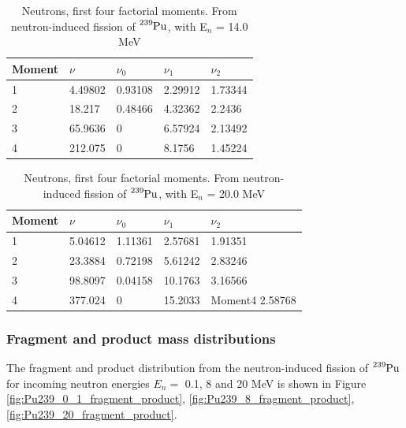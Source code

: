 \documentclass[]{article}
\begin{document}
\begin{table} [H]
	\centering
	\caption{Neutrons, first four factorial moments. From neutron-induced fission of $\ce{^{239}Pu}$, with E$_n$ = 14.0 MeV }
	\begin{tabularx}{\textwidth}{XXXXX} \hline
		\label{tab:Pu239_n_moments_14}
		Moment & $\nu$ & $\nu_0$ & $\nu_1$ & $\nu_2$ \\ \hline
		1 & 4.49802 & 0.93108 & 2.29912 & 1.73344\\
		2 & 18.217 & 0.48466 & 4.32362 & 2.2436\\
		3 & 65.9636 & 0 & 6.57924 & 2.13492\\
		4 & 212.075 & 0 & 8.1756 & 1.45224\\ 
	\end{tabularx}
\end{table}

\begin{table} [H]
	\centering
	\caption{Neutrons, first four factorial moments. From neutron-induced fission of $\ce{^{239}Pu}$, with E$_n$ = 20.0 MeV }
	\begin{tabularx}{\textwidth}{XXXXX} \hline
		\label{tab:Pu239_n_moments_20}
		Moment & $\nu$ & $\nu_0$ & $\nu_1$ & $\nu_2$ \\ \hline
		1 & 5.04612 & 1.11361 & 2.57681 & 1.91351\\
		2 & 23.3884 & 0.72198 & 5.61242 & 2.83246\\
		3 & 98.8097 & 0.04158 & 10.1763 & 3.16566\\
		4 & 377.024 & 0 & 15.2033 & Moment4 2.58768\\ 
	\end{tabularx}
\end{table}

\subsubsection{Fragment and product mass distributions}

The fragment and product distribution from the neutron-induced fission of $\ce{^{239}Pu}$ for incoming neutron energies $E_n=$ 0.1, 8 and 20 MeV is shown in Figure \ref{fig:Pu239_0_1_fragment_product}, \ref{fig:Pu239_8_fragment_product}, \ref{fig:Pu239_20_fragment_product}.
\end{document}
